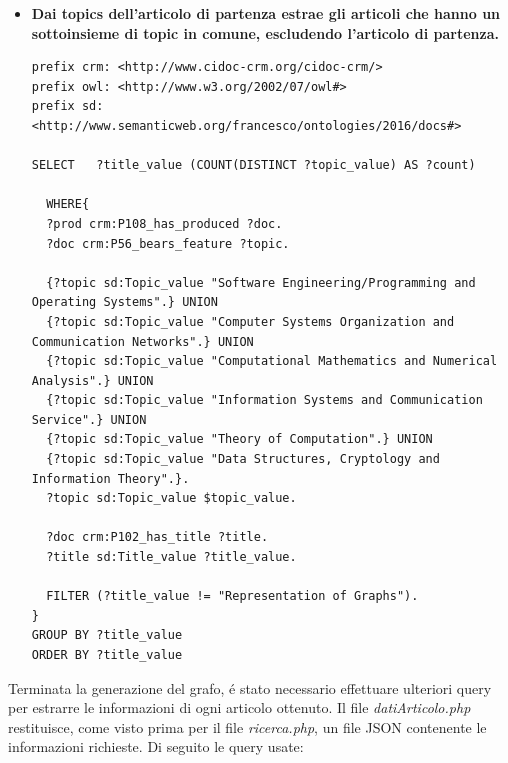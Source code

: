\documentclass[11pt,a4paper]{article}
\begin{document}
\begin{itemize}
\item \textbf{Dai topics dell'articolo di partenza estrae gli articoli che hanno un sottoinsieme di topic in comune, escludendo l'articolo di partenza.}
\begin{lstlisting}[breaklines=true]
prefix crm: <http://www.cidoc-crm.org/cidoc-crm/>
prefix owl: <http://www.w3.org/2002/07/owl#>
prefix sd: <http://www.semanticweb.org/francesco/ontologies/2016/docs#>

SELECT   ?title_value (COUNT(DISTINCT ?topic_value) AS ?count) 
 
  WHERE{
  ?prod crm:P108_has_produced ?doc.
  ?doc crm:P56_bears_feature ?topic.

  {?topic sd:Topic_value "Software Engineering/Programming and Operating Systems".} UNION
  {?topic sd:Topic_value "Computer Systems Organization and Communication Networks".} UNION
  {?topic sd:Topic_value "Computational Mathematics and Numerical Analysis".} UNION
  {?topic sd:Topic_value "Information Systems and Communication Service".} UNION
  {?topic sd:Topic_value "Theory of Computation".} UNION
  {?topic sd:Topic_value "Data Structures, Cryptology and Information Theory".}.
  ?topic sd:Topic_value $topic_value.

  ?doc crm:P102_has_title ?title.
  ?title sd:Title_value ?title_value.
 
  FILTER (?title_value != "Representation of Graphs").
}
GROUP BY ?title_value
ORDER BY ?title_value
\end{lstlisting}
\end{itemize}


Terminata la generazione del grafo, \'e stato necessario effettuare ulteriori query per estrarre le informazioni di ogni articolo ottenuto. Il file \textit{datiArticolo.php} restituisce, come visto prima per il file \textit{ricerca.php}, un file JSON contenente le informazioni richieste. \newline Di seguito le query usate:
\end{document}
